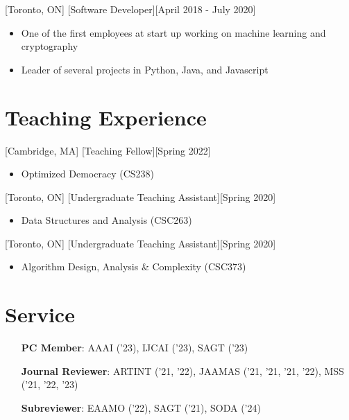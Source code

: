 \documentclass{article}
\begin{document}
    [Toronto, ON]
    [Software Developer][April 2018 - July 2020]
    \begin{itemize}[noitemsep,nolistsep]
        \item One of the first employees at start up working on machine learning and cryptography
        \item Leader of several projects in Python, Java, and Javascript
    \end{itemize}

    
    \section{Teaching Experience}
    [Cambridge, MA]
    [Teaching Fellow][Spring 2022]
    \begin{itemize}
        \item Optimized Democracy (CS238)
    \end{itemize}
    
    [Toronto, ON]
    [Undergraduate Teaching Assistant][Spring 2020]
    \begin{itemize}
        \item Data Structures and Analysis (CSC263)
    \end{itemize}

    [Toronto, ON]
    [Undergraduate Teaching Assistant][Spring 2020]
    \begin{itemize}
        \item Algorithm Design, Analysis \& Complexity (CSC373)
    \end{itemize}
    
    \section{Service}
    \begin{enumerate}[align=left]
    	\item[\textbf{PC Member}:] AAAI ('23), IJCAI ('23), SAGT ('23)
    	\item[\textbf{Journal Reviewer}:] ARTINT ('21, '22), JAAMAS ('21, '21, '21, '22),  MSS ('21, '22, '23)
    	\item[\textbf{Subreviewer}:] EAAMO ('22), SAGT ('21), SODA ('24)
    \end{enumerate}
    
    
\end{document}

